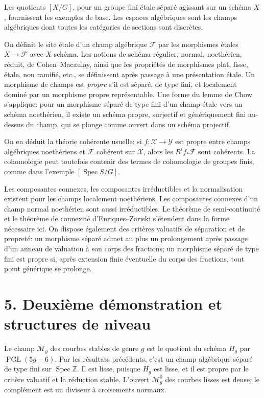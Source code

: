 \documentclass[11pt]{article}
\DeclareMathOperator{\Spec}{Spec}
\DeclareMathOperator{\PGL}{PGL}
\theoremstyle{plain}
\theoremstyle{definition}
\theoremstyle{remark}
\begin{document}
Les quotients \([X/G]\), pour un groupe fini étale séparé agissant sur un schéma \(X\), fournissent les exemples de base. Les espaces algébriques sont les champs algébriques dont toutes les catégories de sections sont discrètes.

On définit le site étale d'un champ algébrique \(\mathcal F\) par les morphismes étales \(X\to\mathcal F\) avec \(X\) schéma. Les notions de schéma régulier, normal, noethérien, réduit, de Cohen--Macaulay, ainsi que les propriétés de morphismes plat, lisse, étale, non ramifié, etc., se définissent après passage à une présentation étale. Un morphisme de champs est \emph{propre} s'il est séparé, de type fini, et localement dominé par un morphisme propre représentable. Une forme du lemme de Chow s'applique: pour un morphisme séparé de type fini d'un champ étale vers un schéma noethérien, il existe un schéma propre, surjectif et génériquement fini au-dessus du champ, qui se plonge comme ouvert dans un schéma projectif.

On en déduit la théorie cohérente usuelle: si \(f:\mathcal X\to\mathcal Y\) est propre entre champs algébriques noethériens et \(\mathcal F\) cohérent sur \(\mathcal X\), alors les \(R^if_*\mathcal F\) sont cohérents. La cohomologie peut toutefois contenir des termes de cohomologie de groupes finis, comme dans l'exemple \([\Spec S/G]\).

Les composantes connexes, les composantes irréductibles et la normalisation existent pour les champs localement noethériens. Les composantes connexes d'un champ normal noethérien sont aussi irréductibles. Le théorème de semi-continuité et le théorème de connexité d'Enriques--Zariski s'étendent dans la forme nécessaire ici. On dispose également des critères valuatifs de séparation et de propreté: un morphisme séparé admet au plus un prolongement après passage d'un anneau de valuation à son corps des fractions; un morphisme séparé de type fini est propre si, après extension finie éventuelle du corps des fractions, tout point générique se prolonge.

\section*{5. Deuxième démonstration et structures de niveau}

Le champ \(\mathcal M_g\) des courbes stables de genre \(g\) est le quotient du schéma \(H_g\) par \(\PGL(5g-6)\). Par les résultats précédents, c'est un champ algébrique séparé de type fini sur \(\Spec\mathbb Z\). Il est lisse, puisque \(H_g\) est lisse, et il est propre par le critère valuatif et la réduction stable. L'ouvert \(\mathcal M_g^0\) des courbes lisses est dense; le complément est un diviseur à croisements normaux.
\end{document}
